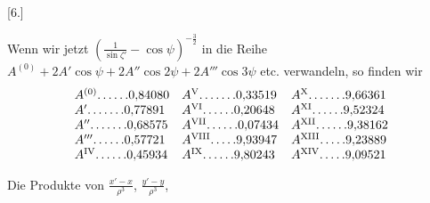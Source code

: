 \clearpage
\begingroup
{}
\renewcommand{\headrulewidth}{0pt}
\par\medskip
{}
\begin{center}[6.]\end{center}
\begingroup
\small
\par\noindent\hspace*{\parindent}Wenn wir jetzt \(\left(\frac{1}{\sin\zeta'}-\cos\psi\right)^{-\frac32}\)
in die Reihe \(A^{(0)}+2A'\cos\psi+2A''\cos2\psi+2A'''\cos3\psi\) etc. verwandeln, so finden wir
\[
\begin{array}{@{}l@{\quad}l@{\quad}l@{}}
A^{(0)}\mathord{.}\,\mathord{.}\,\mathord{.}\,\mathord{.}\,\mathord{.}\,\mathord{.}0{,}84080&A^{\mathrm{V}}\mathord{.}\,\mathord{.}\,\mathord{.}\,\mathord{.}\,\mathord{.}\,\mathord{.}\,\mathord{.}0{,}33519&A^{\mathrm{X}}\mathord{.}\,\mathord{.}\,\mathord{.}\,\mathord{.}\,\mathord{.}\,\mathord{.}\,\mathord{.}9{,}66361\\
A'\mathord{.}\,\mathord{.}\,\mathord{.}\,\mathord{.}\,\mathord{.}\,\mathord{.}\,\mathord{.}0{,}77891&A^{\mathrm{VI}}\mathord{.}\,\mathord{.}\,\mathord{.}\,\mathord{.}\,\mathord{.}\,\mathord{.}0{,}20648&A^{\mathrm{XI}}\mathord{.}\,\mathord{.}\,\mathord{.}\,\mathord{.}\,\mathord{.}\,\mathord{.}9{,}52324\\
A''\mathord{.}\,\mathord{.}\,\mathord{.}\,\mathord{.}\,\mathord{.}\,\mathord{.}\,\mathord{.}0{,}68575&A^{\mathrm{VII}}\mathord{.}\,\mathord{.}\,\mathord{.}\,\mathord{.}\,\mathord{.}\,\mathord{.}0{,}07434&A^{\mathrm{XII}}\mathord{.}\,\mathord{.}\,\mathord{.}\,\mathord{.}\,\mathord{.}\,\mathord{.}9{,}38162\\
A'''\mathord{.}\,\mathord{.}\,\mathord{.}\,\mathord{.}\,\mathord{.}\,\mathord{.}0{,}57721&A^{\mathrm{VIII}}\mathord{.}\,\mathord{.}\,\mathord{.}\,\mathord{.}\,\mathord{.}9{,}93947&A^{\mathrm{XIII}}\mathord{.}\,\mathord{.}\,\mathord{.}\,\mathord{.}\,\mathord{.}9{,}23889\\
A^{\mathrm{IV}}\mathord{.}\,\mathord{.}\,\mathord{.}\,\mathord{.}\,\mathord{.}\,\mathord{.}0{,}45934&A^{\mathrm{IX}}\mathord{.}\,\mathord{.}\,\mathord{.}\,\mathord{.}\,\mathord{.}\,\mathord{.}9{,}80243&A^{\mathrm{XIV}}\mathord{.}\,\mathord{.}\,\mathord{.}\,\mathord{.}\,\mathord{.}9{,}09521
\end{array}
\]
\par\noindent\hspace*{\parindent}Die Produkte von \(\frac{x'-x}{\rho^3}\), \(\frac{y'-y}{\rho^3}\),
